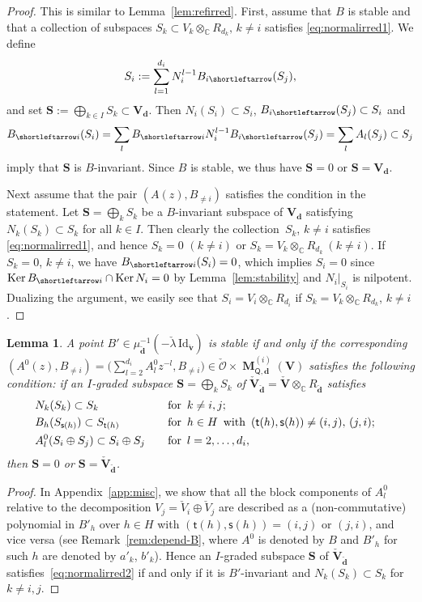 \documentclass[pdftex]{sigma}
\newcommand{\slar}{\shortleftarrow}
\numberwithin{equation}{section}
\newtheorem{Lemma}[Theorem]{Lemma}
\theoremstyle{definition}
\newcommand{\lemref}[1]{Lemma~\ref{#1}}
\newcommand{\remref}[1]{Remark~\ref{#1}}
\newcommand{\C}{\mathbb{C}} %
\newcommand{\Ker}{\operatorname{Ker}}
\newcommand{\unit}{\mathrm{Id}}
\newcommand{\bM}{\operatorname{\mathbf{M}}}
\newcommand{\bV}{\mathbf{V}}
\newcommand{\bv}{\mathbf{v}}
\newcommand{\bS}{\mathbf{S}}
\newcommand{\ved}{\mathbf{d}}
\newcommand{\bO}{\mathcal{O}}
\newcommand{\hquad}{\hspace{.5em}}
\newcommand{\vin}{\mathsf{t}} %
\newcommand{\vout}{\mathsf{s}} %
\newcommand{\QQ}{\mathsf{Q}} %
\begin{document}
\begin{proof}
This is similar to \lemref{lem:refirred}.
First, assume that $B$ is stable and
that a collection of subspaces
$S_k \subset V_k \otimes_\C R_{d_k},\, k \neq i$
satisf\/ies \eqref{eq:normalirred1}.
We def\/ine
\[
S_i := \sum_{l=1}^{d_i} N_i^{l-1} B_{i \slar}(S_j),
\]
and set $\bS := \bigoplus_{k \in I} S_k \subset \bV_\ved$.
Then $N_i(S_i) \subset S_i$, $B_{i \slar}(S_j) \subset S_i$ and
\[
B_{\slar i}(S_i) = \sum_l B_{\slar i}N_i^{l-1}B_{i \slar}(S_j)
= \sum_l A_l(S_j) \subset S_j
\]
imply that $\bS$ is $B$-invariant.
Since $B$ is stable,
we thus have $\bS=0$ or $\bS=\bV_\ved$.

Next assume that the pair $(A(z),B_{\neq i})$ satisf\/ies the condition
in the statement.
Let $\bS=\bigoplus_k S_k$ be a
$B$-invariant subspace of $\bV_\ved$
satisfying $N_k(S_k) \subset S_k$ for all $k \in I$.
Then clearly the collection~$S_k$, $k \neq i$ satisf\/ies
\eqref{eq:normalirred1}, and hence $S_k=0$ $(k\neq i)$ or
$S_k=V_k \otimes_\C R_{d_k}\ (k \neq i)$.
If $S_k=0$, $k\neq i$, we have $B_{\slar i}(S_i)=0$, which implies $S_i=0$
since $\Ker B_{\slar i} \cap \Ker N_i =0$ by \lemref{lem:stability}
and $N_i |_{S_i}$ is nilpotent.
Dualizing the argument, we easily see that
$S_i = V_i \otimes_\C R_{d_i}$ if
$S_k=V_k \otimes_\C R_{d_k}$, $k \neq i$.
\end{proof}

\begin{Lemma}\label{lem:normalirred2}
A point
$B' \in \mu_{\check{\ved}}^{-1}(-\check{\lambda}\,\unit_{\check{\bv}})$
is stable if and only if the corresponding
$(A^0(z),B_{\neq i})=\Big(\sum\limits_{l=2}^{d_i}A^0_lz^{-l},B_{\neq i}\Big)
\in \check{\bO} \times \bM^{(i)}_{\QQ,\ved}(\bV)$
satisfies the following condition:
if an $I$-graded subspace $\bS=\bigoplus_k S_k$ of
$\check{\bV}_{\check{\ved}}=\check{\bV} \otimes_\C R_{\check{\ved}}$ satisfies
\begin{alignat}{3}
& N_k(S_k) \subset S_k \quad &&\text{for}\hquad k \neq i,j; & \notag\\
& B_h(S_{\vout(h)}) \subset S_{\vin(h)}
\quad &&\text{for}\hquad h \in H
\hquad\text{with}\hquad (\vin(h), \vout(h)) \neq (i,j),\,(j,i);&
\label{eq:normalirred2}\\
& A^0_l(S_i \oplus S_j) \subset
S_i \oplus S_j \quad &&\text{for}\hquad l=2, \dots ,d_i, & \notag
\end{alignat}
then $\bS=0$ or $\bS =\check{\bV}_{\check{\ved}}$.
\end{Lemma}

\begin{proof}
In Appendix~\ref{app:misc},
we show that all the block components of $A^0_l$
relative to the decomposition $V_j = \check{V}_i \oplus \check{V}_j$
are described as a (non-commutative) polynomial in $B'_h$
over $h \in H$ with
$(\vin(h),\vout(h))=(i,j)$ or $(j,i)$, and vice versa
(see \remref{rem:depend-B}, where
$A^0$ is denoted by $B$ and $B'_h$
for such $h$ are denoted by $a'_k$, $b'_k$).
Hence an $I$-graded subspace $\bS$ of
$\check{\bV}_{\check{\ved}}$ satisf\/ies~\eqref{eq:normalirred2}
if and only if it is $B'$-invariant and $N_k(S_k) \subset S_k$
for $k \neq i,j$.
\end{proof}
\end{document}

